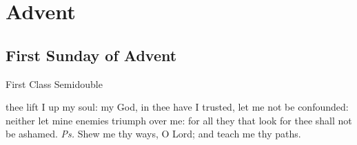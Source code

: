 	\fancyhead[RO,LE]{}
	\fancyhead[RE,LO]{}
	
	\section{Advent}

   \subsection{First Sunday of Advent}\label{AdventI}
\begin{inhead}
    {First Class Semidouble}
\end{inhead}


\introit
{} thee lift I up my soul: my God, in thee have I trusted, let me not be confounded: neither let mine enemies triumph over me: for all they that look for thee shall not be ashamed. \textit{Ps.} Shew me thy ways, O Lord; and teach me thy paths.

